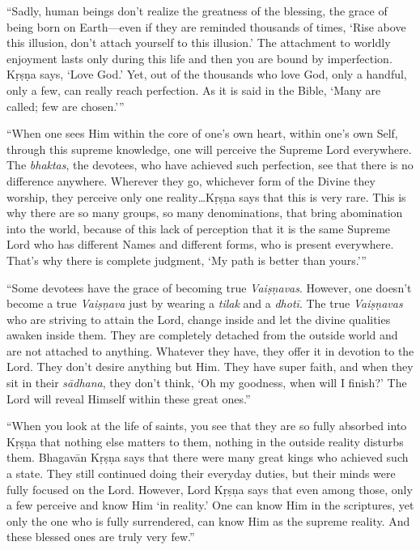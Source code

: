 \enquote{Sadly, human beings don’t realize the greatness of the blessing, the grace of being born on Earth---even if they are reminded thousands of times, \enquote{Rise above this illusion, don’t attach yourself to this illusion.} The attachment to worldly enjoyment lasts only during this life and then you are bound by imperfection. Kṛṣṇa says, \enquote{Love God.} Yet, out of the thousands who love God, only a handful, only a few, can really reach perfection. As it is said in the Bible, \enquote{Many are called; few are chosen.}}

\enquote{When one sees Him within the core of one’s own heart, within one’s own Self, through this supreme knowledge, one will perceive the Supreme Lord everywhere. The \textit{bhaktas}, the devotees, who have achieved such perfection, see that there is no difference anywhere. Wherever they go, whichever form of the Divine they worship, they perceive only one reality\ldots Kṛṣṇa says that this is very rare. This is why there are so many groups, so many denominations, that bring abomination into the world, because of this lack of perception that it is the same Supreme Lord who has different Names and different forms, who is present everywhere. That’s why there is complete judgment, \enquote{My path is better than yours.}}

\enquote{Some devotees have the grace of becoming true \textit{Vaiṣṇavas}. However, one doesn’t become a true \textit{Vaiṣṇava} just by wearing a \textit{tilak} and a \textit{dhotī}. The true \textit{Vaiṣṇavas} who are striving to attain the Lord, change inside and let the divine qualities awaken inside them. They are completely detached from the outside world and are not attached to anything. Whatever they have, they offer it in devotion to the Lord. They don’t desire anything but Him. They have super faith, and when they sit in their \textit{sādhana}, they don’t think, \enquote{Oh my goodness, when will I finish?} The Lord will reveal Himself within these great ones.}

\enquote{When you look at the life of saints, you see that they are so fully absorbed into Kṛṣṇa that nothing else matters to them, nothing in the outside reality disturbs them. Bhagavān Kṛṣṇa says that there were many great kings who achieved such a state. They still continued doing their everyday duties, but their minds were fully focused on the Lord. However, Lord Kṛṣṇa says that even among those, only a few perceive and know Him \enquote{in reality.} One can know Him in the scriptures, yet only the one who is fully surrendered, can know Him as the supreme reality. And these blessed ones are truly very few.}

